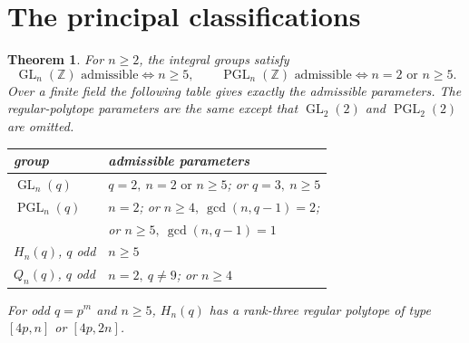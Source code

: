 \documentclass[11pt,a4paper]{article}
\newtheorem{theorem}{Theorem}
\newcommand{\GL}{\operatorname{GL}}
\newcommand{\PGL}{\operatorname{PGL}}
\begin{document}
\section{The principal classifications}
\begin{theorem}
For $n\ge2$, the integral groups satisfy
\[
 \GL_n(\mathbb Z)\text{ admissible}\iff n\ge5,\qquad
 \PGL_n(\mathbb Z)\text{ admissible}\iff n=2\text{ or }n\ge5.
\]
Over a finite field the following table gives exactly the admissible
parameters. The regular-polytope parameters are the same except
that $\GL_2(2)$ and $\PGL_2(2)$ are omitted.
\begin{center}\small
\begin{tabular}{ll}\toprule
group&admissible parameters\\\midrule
$\GL_n(q)$&$q=2,\ n=2\text{ or }n\ge5$; or $q=3,\ n\ge5$\\
$\PGL_n(q)$&$n=2$; or $n\ge4,\ \gcd(n,q-1)=2$;\\
&or $n\ge5,\ \gcd(n,q-1)=1$\\
$H_n(q)$, $q$ odd&$n\ge5$\\
$Q_n(q)$, $q$ odd&$n=2,\ q\ne9$; or $n\ge4$\\\bottomrule
\end{tabular}
\end{center}
For odd $q=p^m$ and $n\ge5$, $H_n(q)$ has a rank-three regular
polytope of type $[4p,n]$ or $[4p,2n]$.
\end{theorem}
\end{document}
